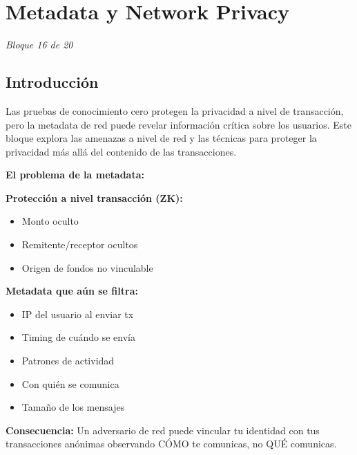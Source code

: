 \documentclass[11pt,a4paper,twoside]{book}
\theoremstyle{definition}
\theoremstyle{remark}
\renewcommand{\cleardoublepage}{\clearpage}
\begin{document}

\cleardoublepage


\chapter{Metadata y Network Privacy}
\label{ch:bloque16}

\begin{center}
\textit{Bloque 16 de 20}
\end{center}

\section*{Introducción}

Las pruebas de conocimiento cero protegen la privacidad a nivel de transacción, pero la metadata de red puede revelar información crítica sobre los usuarios. Este bloque explora las amenazas a nivel de red y las técnicas para proteger la privacidad más allá del contenido de las transacciones.

\begin{keyidea}
\textbf{El problema de la metadata:}

\textbf{Protección a nivel transacción (ZK):}
\begin{itemize}
    \item Monto oculto
    \item Remitente/receptor ocultos
    \item Origen de fondos no vinculable
\end{itemize}

\textbf{Metadata que aún se filtra:}
\begin{itemize}
    \item IP del usuario al enviar tx
    \item Timing de cuándo se envía
    \item Patrones de actividad
    \item Con quién se comunica
    \item Tamaño de los mensajes
\end{itemize}

\textbf{Consecuencia:} Un adversario de red puede vincular tu identidad con tus transacciones anónimas observando CÓMO te comunicas, no QUÉ comunicas.
\end{keyidea}
\end{document}
